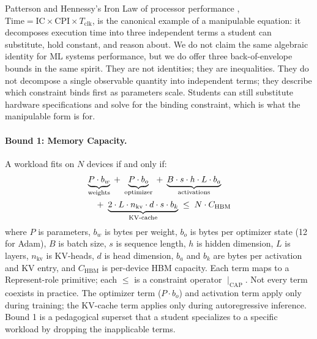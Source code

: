\documentclass[10pt,twocolumn]{article}
\begin{document}
Patterson and Hennessy's Iron Law of processor performance \citep{hennessy2019architecture}, $\text{Time} = \text{IC} \times \text{CPI} \times T_{\text{clk}}$, is the canonical example of a manipulable equation: it decomposes execution time into three independent terms a student can substitute, hold constant, and reason about. We do not claim the same algebraic identity for ML systems performance, but we do offer three back-of-envelope bounds in the same spirit. They are not identities; they are inequalities. They do not decompose a single observable quantity into independent terms; they describe which constraint binds first as parameters scale. Students can still substitute hardware specifications and solve for the binding constraint, which is what the manipulable form is for.

\paragraph{Bound 1: Memory Capacity.} A workload fits on $N$ devices if and only if:
\begin{align}
\label{eq:iron-capacity}
&\underbrace{P \cdot b_w}_{\text{weights}} \;+\; \underbrace{P \cdot b_o}_{\text{optimizer}} \;+\; \underbrace{B \cdot s \cdot h \cdot L \cdot b_a}_{\text{activations}} \notag \\
&\quad +\; \underbrace{2 \cdot L \cdot n_{\text{kv}} \cdot d \cdot s \cdot b_k}_{\text{KV-cache}} \;\leq\; N \cdot C_{\text{HBM}}
\end{align}
where $P$ is parameters, $b_w$ is bytes per weight, $b_o$ is bytes per optimizer state (12 for Adam), $B$ is batch size, $s$ is sequence length, $h$ is hidden dimension, $L$ is layers, $n_{\text{kv}}$ is KV-heads, $d$ is head dimension, $b_a$ and $b_k$ are bytes per activation and KV entry, and $C_{\text{HBM}}$ is per-device HBM capacity. Each term maps to a Represent-role primitive; each $\leq$ is a constraint operator $\mid_{\text{CAP}}$. Not every term coexists in practice. The optimizer term ($P \cdot b_o$) and activation term apply only during training; the KV-cache term applies only during autoregressive inference. Bound 1 is a pedagogical superset that a student specializes to a specific workload by dropping the inapplicable terms.
\end{document}
